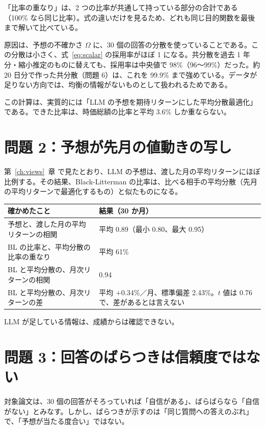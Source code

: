 \documentclass[xelatex,ja=standard,jafont=hiragino-pron,a4paper,10pt]{bxjsreport}
\newcommand{\chapref}[1]{第~\ref{#1}~章}
\begin{document}
「比率の重なり」は、2 つの比率が共通して持っている部分の合計である（100\% なら同じ比率）。式の違いだけを見るため、どれも同じ目的関数を最後まで解いて比べている。

原因は、予想の不確かさ $\Omega$ に、30 個の回答の分散を使っていることである。この分散は小さく、式~\eqref{eq:scalar} の採用率がほぼ 1 になる。共分散を過去 1 年分・縮小推定のものに替えても、採用率は中央値で 98\%（96〜99\%）だった。約 20 日分で作った共分散（問題 6）は、これを 99.9\% まで強めている。データが足りない方向では、均衡の情報がないものとして扱われるためである。

この計算は、実質的には「LLM の予想を期待リターンにした平均分散最適化」である。できた比率は、時価総額の比率と平均 3.6\% しか重ならない。

\section{問題 2：予想が先月の値動きの写し}

\chapref{ch:views} で見たとおり、LLM の予想は、渡した月の平均リターンにほぼ比例する。その結果、Black-Litterman の比率は、比べる相手の平均分散（先月の平均リターンで最適化するもの）と似たものになる。

\begin{longtable}{p{8.40cm}p{6.00cm}}
\toprule
\textbf{確かめたこと} & \textbf{結果（30 か月）} \\
\midrule
\endfirsthead
\bottomrule
\endfoot
予想と、渡した月の平均リターンの相関 & 平均 0.89（最小 0.80、最大 0.95） \\
BL の比率と、平均分散の比率の重なり & 平均 61\% \\
BL と平均分散の、月次リターンの相関 & 0.94 \\
BL と平均分散の、月次リターンの差 & 平均 $+0.34\%$／月、標準偏差 2.43\%。$t$ 値は 0.76 で、差があるとは言えない \\
\end{longtable}

LLM が足している情報は、成績からは確認できない。

\section{問題 3：回答のばらつきは信頼度ではない}

対象論文は、30 個の回答がそろっていれば「自信がある」、ばらばらなら「自信がない」とみなす。しかし、ばらつきが示すのは「同じ質問への答えのぶれ」で、「予想が当たる度合い」ではない。
\end{document}
